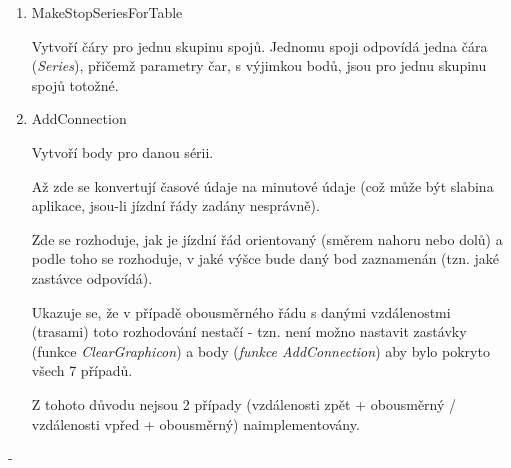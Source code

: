 \documentclass[14pt]{article}
\begin{document}
\begin{enumerate}
\begin{enumerate}
\item MakeStopSeriesForTable

Vytvoří čáry pro jednu skupinu spojů. Jednomu spoji odpovídá jedna čára (\textit{Series}), přičemž parametry čar, s výjimkou bodů, jsou pro jednu skupinu spojů totožné.

\item AddConnection

Vytvoří body pro danou sérii.

Až zde se konvertují časové údaje na minutové údaje (což může být slabina aplikace, jsou-li jízdní řády zadány nesprávně).

Zde se rozhoduje, jak je jízdní řád orientovaný (směrem nahoru nebo dolů) a podle toho se rozhoduje, v jaké výšce bude daný bod zaznamenán (tzn. jaké zastávce odpovídá). 

Ukazuje se, že v případě obousměrného řádu s danými vzdálenostmi (trasami) toto rozhodování nestačí - tzn. není možno nastavit zastávky (funkce \textit{ClearGraphicon}) a body (\textit{funkce AddConnection}) aby bylo pokryto všech 7 případů.

Z tohoto důvodu nejsou 2 případy (vzdálenosti zpět + obousměrný / vzdálenosti vpřed + obousměrný) naimplementovány.

\end{enumerate}

\end{enumerate}

- 
\end{document}
